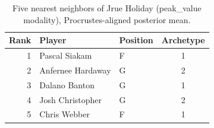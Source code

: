 \begin{table}[htbp]
  \centering\small
  \begin{tabular}{rllc}
    \toprule
    Rank & Player & Position & Archetype \\
    \midrule
    1 & Pascal Siakam & F & 1 \\
    2 & Anfernee Hardaway & G & 2 \\
    3 & Dalano Banton & G & 1 \\
    4 & Josh Christopher & G & 2 \\
    5 & Chris Webber & F & 1 \\
    \bottomrule
  \end{tabular}
  \caption{Five nearest neighbors of Jrue Holiday (peak_value modality), Procrustes-aligned posterior mean.}
  \label{tab:Jrue_Holiday_neighbors_peak_value}
\end{table}


